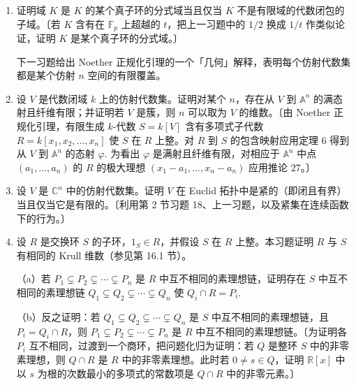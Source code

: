 \begin{enumerate}
（a）证明 \(K\) 在 \(F\) 上代数。〔若 \(t\) 在 \(F\) 上超越，证明 \(1/2 \notin A[t]\).〕

（b）证明 \(A\) 在 \(K\) 中整闭。〔证明 \(1/2\) 不在 \(A\) 于 \(K\) 中的整闭包中。〕

（c）由（a）与（b）推出 \(K = F\).

\item 证明域 \(K\) 是 \(K\) 的某个真子环的分式域当且仅当 \(K\) 不是有限域的代数闭包的子域。〔若 \(K\) 含有在 \(\mathbb{F}_p\) 上超越的 \(t\)，把上一习题中的 \(1/2\) 换成 \(1/t\) 作类似论证，证明 \(K\) 是某个真子环的分式域。〕

\noindent 下一习题给出 Noether 正规化引理的一个「几何」解释，表明每个仿射代数集都是某个仿射 \(n\) 空间的有限覆盖。

\item 设 \(V\) 是代数闭域 \(k\) 上的仿射代数集。证明对某个 \(n\)，存在从 \(V\) 到 \(\mathbb{A}^n\) 的满态射且纤维有限；并证明若 \(V\) 是簇，则 \(n\) 可以取为 \(V\) 的维数。〔由 Noether 正规化引理，有限生成 \(k\)-代数 \(S = k[V]\) 含有多项式子代数 \(R = k[x_1, x_2, \ldots, x_n]\) 使 \(S\) 在 \(R\) 上整。对 \(R\) 到 \(S\) 的包含映射应用定理 6 得到从 \(V\) 到 \(\mathbb{A}^n\) 的态射 \(\varphi\). 为看出 \(\varphi\) 是满射且纤维有限，对相应于 \(\mathbb{A}^n\) 中点 \((a_1, \ldots, a_n)\) 的 \(R\) 的极大理想 \((x_1-a_1, \ldots, x_n-a_n)\) 应用推论 27。〕

\item 设 \(V\) 是 \(\mathbb{C}^n\) 中的仿射代数集。证明 \(V\) 在 Euclid 拓扑中是紧的（即闭且有界）当且仅当它是有限的。〔利用第 2 节习题 18、上一习题，以及紧集在连续函数下的行为。〕

\item 设 \(R\) 是交换环 \(S\) 的子环，\(1_S \in R\)，并假设 \(S\) 在 \(R\) 上整。本习题证明 \(R\) 与 \(S\) 有相同的 Krull 维数（参见第 16.1 节）。

（a）若 \(P_1 \subsetneq P_2 \subsetneq \cdots \subsetneq P_n\) 是 \(R\) 中互不相同的素理想链，证明存在 \(S\) 中互不相同的素理想链 \(Q_1 \subsetneq Q_2 \subsetneq \cdots \subsetneq Q_n\) 使 \(Q_i \cap R = P_i\).

（b）反之证明：若 \(Q_1 \subsetneq Q_2 \subsetneq \cdots \subsetneq Q_n\) 是 \(S\) 中互不相同的素理想链，且 \(P_i = Q_i \cap R\)，则 \(P_1 \subsetneq P_2 \subsetneq \cdots \subsetneq P_n\) 是 \(R\) 中互不相同的素理想链。〔为证明各 \(P_i\) 互不相同，过渡到一个商环，把问题化归为证明：若 \(Q\) 是整环 \(S\) 中的非零素理想，则 \(Q \cap R\) 是 \(R\) 中的非零素理想。此时若 \(0 \neq s \in Q\)，证明 \(\mathbb{R}[x]\) 中以 \(s\) 为根的次数最小的多项式的常数项是 \(Q \cap R\) 中的非零元素。〕


\end{enumerate}
